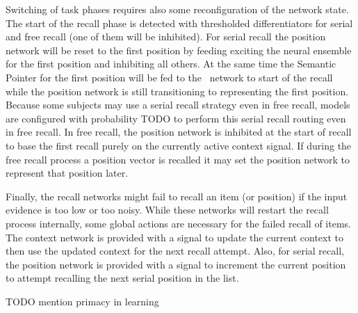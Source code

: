 Switching of task phases requires also some reconfiguration of the network state.
The start of the recall phase is detected with thresholded differentiators for serial and free recall (one of them will be inhibited).
For serial recall the position network will be reset to the first position by feeding exciting the neural ensemble for the first position and inhibiting all others.
At the same time the Semantic Pointer for the first position will be fed to the \mft\ network to start of the recall while the position network is still transitioning to representing the first position.
Because some subjects may use a serial recall strategy even in free recall, models are configured with probability TODO to perform this serial recall routing even in free recall.
In free recall, the position network is inhibited at the start of recall to base the first recall purely on the currently active context signal.
If during the free recall process a position vector is recalled it may set the position network to represent that position later.

Finally, the recall networks might fail to recall an item (or position) if the input evidence is too low or too noisy.
While these networks will restart the recall process internally, some global actions are necessary for the failed recall of items.
The context network is provided with a signal to update the current context to then use the updated context for the next recall attempt.
Also, for serial recall, the position network is provided with a signal to increment the current position to attempt recalling the next serial position in the list.

TODO mention primacy in learning
